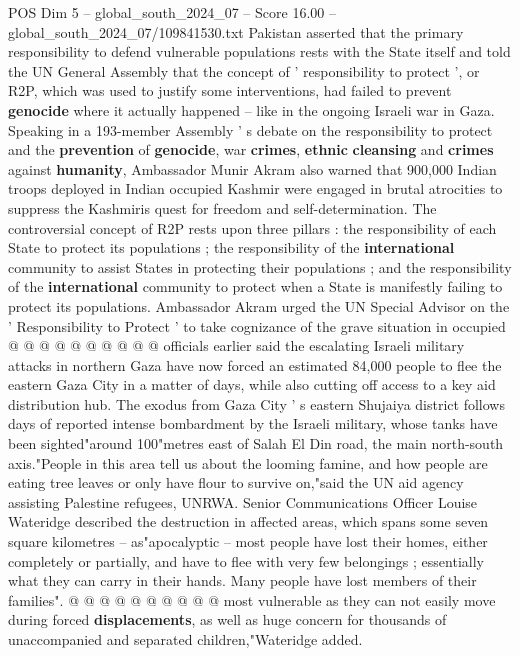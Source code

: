 \begin{textsample}{POS Dim 5 – global\_south\_2024\_07 – Score 16.00 – global\_south\_2024\_07/109841530.txt}  \label{ex:f5_pos_177}
Pakistan asserted that the primary responsibility to defend vulnerable populations rests with the State itself and told the UN General Assembly that the concept of ' responsibility to protect ', or R2P, which was used to justify some interventions, had failed to prevent \textbf{genocide} where it actually happened -- like in the ongoing Israeli war in Gaza.
Speaking in a 193-member Assembly ' s debate on the responsibility to protect and the \textbf{prevention} of \textbf{genocide}, war \textbf{crimes}, \textbf{ethnic} \textbf{cleansing} and \textbf{crimes} against \textbf{humanity}, Ambassador Munir Akram also warned that 900,000 Indian troops deployed in Indian occupied Kashmir were engaged in brutal atrocities to suppress the Kashmiris quest for freedom and self-determination.
The controversial concept of R2P rests upon three pillars : the responsibility of each State to protect its populations ; the responsibility of the \textbf{international} community to assist States in protecting their populations ; and the responsibility of the \textbf{international} community to protect when a State is manifestly failing to protect its populations.
Ambassador Akram urged the UN Special Advisor on the ' Responsibility to Protect ' to take cognizance of the grave situation in occupied @ @ @ @ @ @ @ @ @ @ officials earlier said the escalating Israeli military attacks in northern Gaza have now forced an estimated 84,000 people to flee the eastern Gaza City in a matter of days, while also cutting off access to a key aid distribution hub.
The exodus from Gaza City ' s eastern Shujaiya district follows days of reported intense bombardment by the Israeli military, whose tanks have been sighted"around 100"metres east of Salah El Din road, the main north-south axis."People in this area tell us about the looming famine, and how people are eating tree leaves or only have flour to survive on,"said the UN aid agency assisting Palestine refugees, UNRWA.
Senior Communications Officer Louise Wateridge described the destruction in affected areas, which spans some seven square kilometres -- as"apocalyptic -- most people have lost their homes, either completely or partially, and have to flee with very few belongings ; essentially what they can carry in their hands.
Many people have lost members of their families". @ @ @ @ @ @ @ @ @ @ most vulnerable as they can not easily move during forced \textbf{displacements}, as well as huge concern for thousands of unaccompanied and separated children,"Wateridge added.

\end{textsample}
